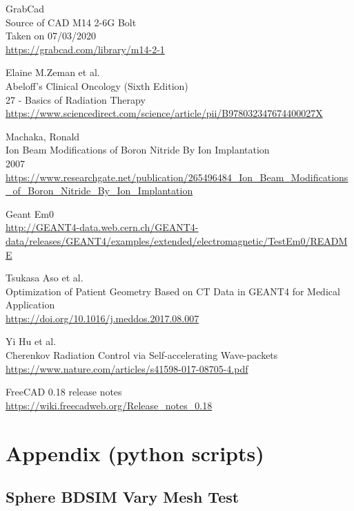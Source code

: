\documentclass[12pt,a4paper]{article}
\begin{document}
\begin{thebibliography}{1}
	GrabCad\\
	Source of CAD M14 2-6G Bolt\\
	Taken on 07/03/2020\\
	\url{https://grabcad.com/library/m14-2-1}

	Elaine M.Zeman et al.\\
	Abeloff's Clinical Oncology (Sixth Edition)\\
	27 - Basics of Radiation Therapy\\
	\url{https://www.sciencedirect.com/science/article/pii/B978032347674400027X}
	
	Machaka, Ronald\\
	Ion Beam Modifications of Boron Nitride By Ion Implantation\\
	2007\\
	\url{https://www.researchgate.net/publication/265496484_Ion_Beam_Modifications_of_Boron_Nitride_By_Ion_Implantation}
	
	Geant Em0\\
	\url{http://GEANT4-data.web.cern.ch/GEANT4-data/releases/GEANT4/examples/extended/electromagnetic/TestEm0/README}

	Tsukasa Aso et al.\\
	Optimization of Patient Geometry Based on CT Data in GEANT4 for Medical Application\\
	\url{https://doi.org/10.1016/j.meddos.2017.08.007}

	Yi Hu et al.\\
	Cherenkov Radiation Control via Self-accelerating Wave-packets\\
	\url{https://www.nature.com/articles/s41598-017-08705-4.pdf}

	FreeCAD 0.18 release notes\\
	\url{https://wiki.freecadweb.org/Release_notes_0.18}

\end{thebibliography}

\normalsize
\newpage
\appendix
\setcounter{figure}{0} 
\section{Appendix (python scripts)}
\subsection{Sphere BDSIM Vary Mesh Test}
\label{ap1}

\end{document}
